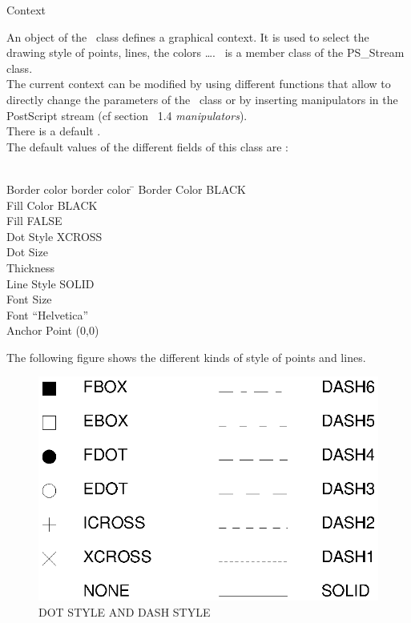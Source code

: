 \begin{ccClass} {Context}

\ccDefinition

An object of the \ccClassName\ class defines a graphical context. It is used 
to select the drawing style of points, lines, the colors \ldots.
\ccClassName\ is a member class of the PS\_Stream class.\\

The current context can be modified by using
different functions that allow to directly change the parameters of the
\ccClassName\ class or by
inserting manipulators in the PostScript stream (cf section ~1.4 {\em manipulators}).\\ 

There is a default \ccClassName. \\
The default values of the different fields of this class are : \\
\\
\par
\begin{tabbing}
Border color border color \= \kill
Border Color     \>            BLACK\\
Fill Color       \>            BLACK\\
Fill             \>            FALSE\\
Dot Style        \>            XCROSS\\
Dot Size         \\
Thickness        \\
Line Style       \>            SOLID\\
Font Size        \\
Font             \>            ``Helvetica''\\
Anchor Point     \>            (0,0)\\
\end{tabbing}

The following figure shows the different kinds of style of points and lines.

\begin{figure}[h]
\includegraphics{style.ps}
\caption{DOT STYLE AND DASH STYLE}
\end{figure}


\end{ccClass}
